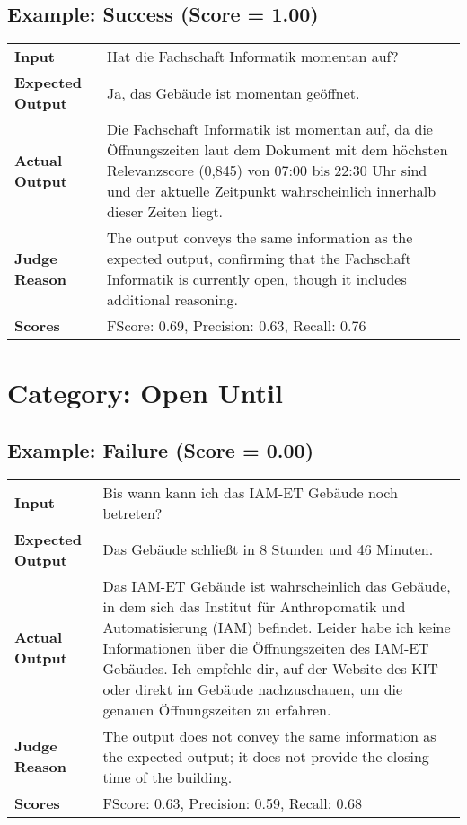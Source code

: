 \documentclass{article}
\begin{document}
\subsection*{Example: Success (Score = 1.00)}
\begin{longtable}{p{} p{}}
\textbf{Input} & Hat die Fachschaft Informatik momentan auf? \\
\textbf{Expected Output} & Ja, das Gebäude ist momentan geöffnet. \\
\textbf{Actual Output} & Die Fachschaft Informatik ist momentan auf, da die Öffnungszeiten laut dem Dokument mit dem höchsten Relevanzscore (0,845) von 07:00 bis 22:30 Uhr sind und der aktuelle Zeitpunkt wahrscheinlich innerhalb dieser Zeiten liegt. \\
\textbf{Judge Reason} & The output conveys the same information as the expected output, confirming that the Fachschaft Informatik is currently open, though it includes additional reasoning. \\
\textbf{Scores} & FScore: 0.69, Precision: 0.63, Recall: 0.76 \\
\end{longtable}
\section*{Category: Open Until}
\subsection*{Example: Failure (Score = 0.00)}
\begin{longtable}{p{} p{}}
\textbf{Input} & Bis wann kann ich das IAM-ET Gebäude noch betreten? \\
\textbf{Expected Output} & Das Gebäude schließt in 8 Stunden und 46 Minuten. \\
\textbf{Actual Output} & Das IAM-ET Gebäude ist wahrscheinlich das Gebäude, in dem sich das Institut für Anthropomatik und Automatisierung (IAM) befindet. Leider habe ich keine Informationen über die Öffnungszeiten des IAM-ET Gebäudes. Ich empfehle dir, auf der Website des KIT oder direkt im Gebäude nachzuschauen, um die genauen Öffnungszeiten zu erfahren. \\
\textbf{Judge Reason} & The output does not convey the same information as the expected output; it does not provide the closing time of the building. \\
\textbf{Scores} & FScore: 0.63, Precision: 0.59, Recall: 0.68 \\
\end{longtable}
\end{document}
